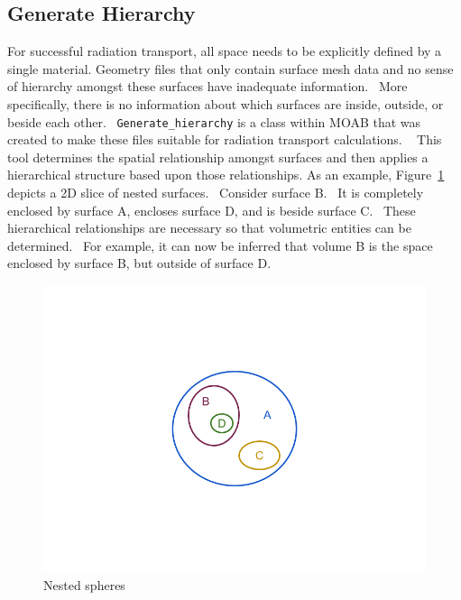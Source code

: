 \subsection{Generate Hierarchy}
For successful radiation transport, all space needs to be explicitly defined by a single material. 
Geometry files that only contain surface mesh data and no sense of hierarchy amongst these surfaces
have inadequate information.  More specifically, there is no information about which surfaces are inside,
outside, or beside each other.  \texttt{Generate\_hierarchy} is a class within MOAB \cite{genhi} that was created to
make these files suitable for radiation transport calculations.   This tool determines the spatial relationship
amongst surfaces and then applies a hierarchical structure based upon those relationships. As an example, 
Figure~\ref{fig:spheres} depicts a 2D slice of nested surfaces.  Consider surface B.  It is completely enclosed by surface A, 
encloses surface D, and is beside surface C.  These hierarchical relationships are necessary so that 
volumetric entities can be determined.  For example, it can now be inferred that volume B is the space enclosed by 
surface B, but outside of surface D.

\begin{figure}[h!]
 \begin{centering}
 \centering
 \includegraphics[width=\paperwidth]{../figs/nested_spheres.png}
 \caption{Nested spheres}
 \label{fig:spheres}
 \end{centering}
\end{figure}

